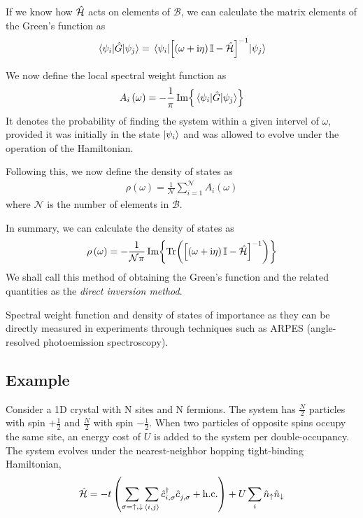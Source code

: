 	If we know how $ \hat{\mathcal{H}} $ acts on elements of $ \mathcal{B} $, we can calculate the matrix elements of the Green's function as
	\begin{align}
		\mel{\psi_i}{\hat{G}}{\psi_j} = \mel{\psi_i}{\left[ \left( \omega + \mathrm{i}\eta\right) \mathbb{I} - \hat{\mathcal{H}}\right]^{-1}}{\psi_j}
	\end{align}
	
	We now define the local spectral weight function as
	\begin{align}
		A_{i} \left( \omega \right) = -\frac{1}{\pi} \Im{ {\mel{\psi_i}{\hat{G}}{\psi_j}} }
	\end{align}
	It denotes the probability of finding the system within a given intervel of $ \omega $, provided it was initially in the state $ \ket{\psi_i} $ and was allowed to evolve under the operation of the Hamiltonian.
	
	Following this, we now define the density of states as
	\begin{align}\label{eqn:dossum}
		\rho \left( \omega \right) = \frac{1}{\mathcal{N}} \sum_{i = 1}^{\mathcal{N}} A_{i} \left( \omega \right)
	\end{align}
	where $ \mathcal{N} $ is the number of elements in $ \mathcal{B} $.
	
	In summary, we can calculate the density of states as
	\begin{align}\label{eqn:dosfinal}
		\rho \left( \omega \right) = -\frac{1}{\mathcal{N \pi}} \Im{ \Tr( \left[ \left( \omega + \mathrm{i}\eta\right) \mathbb{I} - \hat{\mathcal{H}}\right]^{-1} ) }
	\end{align}
	We shall call this method of obtaining the Green's function and the related quantities as the \emph{direct inversion method}.
	
	Spectral weight function and density of states of importance as they can be directly measured in experiments through techniques such as ARPES (angle-resolved photoemission spectroscopy).
	
	\subsection*{Example}
		Consider a 1D crystal with N sites and N fermions. The system has $ \tfrac{N}{2} $ particles with spin $ +\tfrac{1}{2} $ and $ \tfrac{N}{2} $ with spin $ -\tfrac{1}{2} $. When two particles of opposite spins occupy the same site, an energy cost of $ U $ is added to the system per double-occupancy. The system evolves under the nearest-neighbor hopping tight-binding Hamiltonian,
		\begin{align}\label{eqn:tight-binding-hamil}
			\hat{\mathcal{H}} = -t \left(\sum_{\sigma = \uparrow, \downarrow} \sum_{\expval{i,j}} \hat{c}^{\dagger}_{i, \sigma} \hat{c}^{}_{j, \sigma} + \mathrm{h.c.} \right) + U \sum_{i}\hat{n}_{\uparrow} \hat{n}_{\downarrow}
		\end{align}
		

